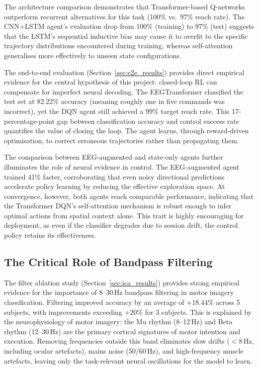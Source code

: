 \documentclass[12pt, a4paper]{article}
\begin{document}
The architecture comparison demonstrates that Transformer-based Q-networks outperform recurrent alternatives for this task (100\% vs.~97\% reach rate). The CNN+LSTM agent's evaluation drop from 100\% (training) to 97\% (test) suggests that the LSTM's sequential inductive bias may cause it to overfit to the specific trajectory distributions encountered during training, whereas self-attention generalises more effectively to unseen state configurations.

The end-to-end evaluation (Section~\ref{sec:e2e_results}) provides direct empirical evidence for the central hypothesis of this project: closed-loop RL can compensate for imperfect neural decoding. The EEGTransformer classified the test set at 82.22\% accuracy (meaning roughly one in five commands was incorrect), yet the DQN agent still achieved a 99\% target reach rate. This 17-percentage-point gap between classification accuracy and control success rate quantifies the value of closing the loop. The agent learns, through reward-driven optimisation, to correct erroneous trajectories rather than propagating them.

The comparison between EEG-augmented and state-only agents further illuminates the role of neural evidence in control. The EEG-augmented agent trained 41\% faster, corroborating that even noisy directional predictions accelerate policy learning by reducing the effective exploration space. At convergence, however, both agents reach comparable performance, indicating that the Transformer DQN's self-attention mechanism is robust enough to infer optimal actions from spatial context alone. This trait is highly encouraging for deployment, as even if the classifier degrades due to session drift, the control policy retains its effectiveness.

\subsection{The Critical Role of Bandpass Filtering}

The filter ablation study (Section~\ref{sec:ica_results}) provides strong empirical evidence for the importance of 8--30\,Hz bandpass filtering in motor imagery classification. Filtering improved accuracy by an average of $+18.44\%$ across 5 subjects, with improvements exceeding $+20\%$ for 3 subjects. This is explained by the neurophysiology of motor imagery: the Mu rhythm (8--12\,Hz) and Beta rhythm (12--30\,Hz) are the primary cortical signatures of motor intention and execution. Removing frequencies outside this band eliminates slow drifts ($<$8\,Hz, including ocular artefacts), mains noise (50/60\,Hz), and high-frequency muscle artefacts, leaving only the task-relevant neural oscillations for the model to learn.
\end{document}
